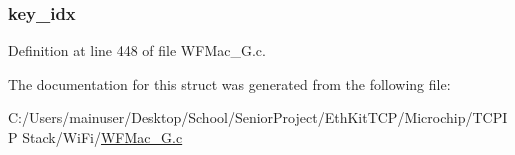 \subsubsection[{key\+\_\+idx}]{ key\+\_\+idx}\label{structsec__wep104_af9aac195765cf2f2eb0b857c99c96a74}


Definition at line 448 of file W\+F\+Mac\+\_\+G.\+c.



The documentation for this struct was generated from the following file\+:\begin{DoxyCompactItemize}
\item 
C\+:/\+Users/mainuser/\+Desktop/\+School/\+Senior\+Project/\+Eth\+Kit\+T\+C\+P/\+Microchip/\+T\+C\+P\+I\+P Stack/\+Wi\+Fi/\hyperlink{_w_f_mac__24_g_8c}{W\+F\+Mac\+\_\+G.\+c}\end{DoxyCompactItemize}
